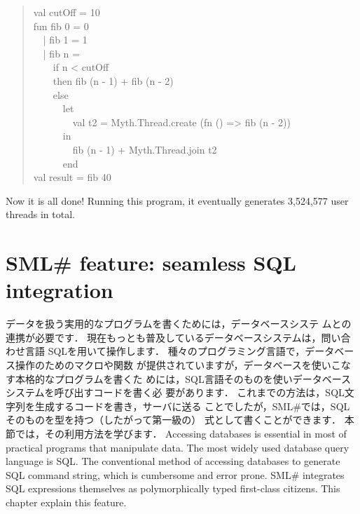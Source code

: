 \documentclass{jbook}
\newcommand{\txt}[2]{#2}
\newcommand{\smlsharp}{SML\#}
\newenvironment{program}{\begin{quote}\begin{tt}}%
                        {\end{tt}\end{quote}}
\begin{document}
\begin{program}
val cutOff = 10\\
fun fib 0 = 0\\
\ \ | fib 1 = 1\\
\ \ | fib n =\\
\ \ \ \ if n < cutOff\\
\ \ \ \ then fib (n - 1) + fib (n - 2)\\
\ \ \ \ else\\
\ \ \ \ \ \ let\\
\ \ \ \ \ \ \ \ val t2 = Myth.Thread.create (fn () => fib (n - 2))\\
\ \ \ \ \ \ in\\
\ \ \ \ \ \ \ \ fib (n - 1) + Myth.Thread.join t2\\
\ \ \ \ \ \ end\\
val result = fib 40
\end{program}
	Now it is all done!
        Running this program, it eventually generates 3,524,577 user
threads in total.

\fi%

\chapter{
\txt{\smlsharp{}の拡張機能：SQLの統合}
{\smlsharp{} feature: seamless SQL integration}
}
\label{chap:tutorialDatabase}

\ifjp%
	データを扱う実用的なプログラムを書くためには，データベースシステ
ムとの連携が必要です．
	現在もっとも普及しているデータベースシステムは，問い合わせ言語
SQLを用いて操作します．
	種々のプログラミング言語で，データベース操作のためのマクロや関数
が提供されていますが，データベースを使いこなす本格的なプログラムを書くた
めには，SQL言語そのものを使いデータベースシステムを呼び出すコードを書く必
要があります． 
	これまでの方法は，SQL文字列を生成するコードを書き，サーバに送る
ことでしたが，\smlsharp{}では，SQLそのものを型を持つ（したがって第一級の）
式として書くことができます．
	本節では，その利用方法を学びます．
\else%
	Accessing databases is essential in most of practical programs
that manipulate data.
	The most widely used database query language is SQL.
	The conventional method of accessing databases to generate SQL
command string, which is cumbersome and error prone.
	\smlsharp{} integrates SQL expressions themselves as
polymorphically typed first-class citizens.
	This chapter explain this feature.
\fi%
	
\end{document}

